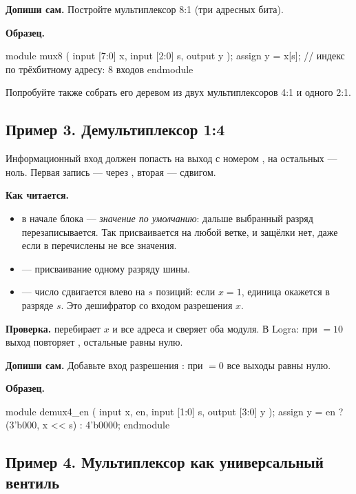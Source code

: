 \textbf{Допиши сам.} Постройте мультиплексор 8:1 (три адресных бита).

\textbf{Образец.}
\begin{vcode}
module mux8 (
    input  [7:0] x,
    input  [2:0] s,
    output       y
);
    assign y = x[s];     // индекс по трёхбитному адресу: 8 входов
endmodule
\end{vcode}
Попробуйте также собрать его деревом из двух мультиплексоров 4:1 и одного 2:1.

\subsection{Пример 3. Демультиплексор 1:4}

Информационный вход  должен попасть на выход с номером , на
остальных --- ноль. Первая запись --- через , вторая --- сдвигом.


\textbf{Как читается.}
\begin{itemize}
  \item {} в начале блока --- \emph{значение по умолчанию}: дальше выбранный разряд перезаписывается. Так  присваивается на любой ветке, и защёлки нет, даже если в  перечислены не все значения.
  \item {} --- присваивание одному разряду шины.
  \item {} --- число  сдвигается влево на $s$ позиций: если $x=1$, единица окажется в разряде $s$. Это дешифратор со входом разрешения $x$.
\end{itemize}
\textbf{Проверка.}  перебирает $x$ и все адреса и сверяет оба
модуля. В Logra: при  $=10$ выход  повторяет ,
остальные равны нулю.

\textbf{Допиши сам.} Добавьте вход разрешения : при  $=0$ все
выходы равны нулю.

\textbf{Образец.}
\begin{vcode}
module demux4_en (
    input        x, en,
    input  [1:0] s,
    output [3:0] y
);
    assign y = en ? ({3'b000, x} << s) : 4'b0000;
endmodule
\end{vcode}

\subsection{Пример 4. Мультиплексор как универсальный вентиль}

